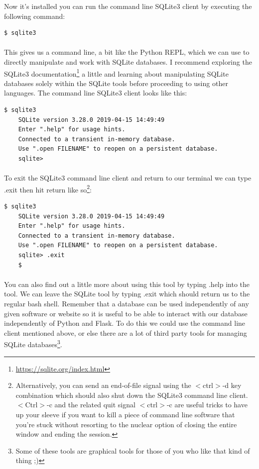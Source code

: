 \documentclass[12pt, a4paper, oneside]{book}
\begin{document}
{Now it's installed you can run the command line SQLite3 client by executing the following command:

\begin{lstlisting}[style=DOS]
    $ sqlite3
\end{lstlisting}

\paragraph{} This gives us a command line, a bit like the Python REPL, which we can use to directly manipulate and work with SQLite databases. I recommend exploring the SQLite3 documentation\footnote{\url{https://sqlite.org/index.html}} a little and learning about manipulating SQLite databases solely within the SQLite tools before proceeding to using other languages. The command line SQLite3 client looks like this:

\begin{lstlisting}[style=DOS]
    $ sqlite3 
    SQLite version 3.28.0 2019-04-15 14:49:49
    Enter ".help" for usage hints.
    Connected to a transient in-memory database.
    Use ".open FILENAME" to reopen on a persistent database.
    sqlite> 
\end{lstlisting}

\paragraph{} To exit the SQLite3 command line client and return to our terminal we can type .exit then hit return like so\footnote{Alternatively, you can send an end-of-file signal using the $<$ctrl$>$-d key combination which should also shut down the SQLite3 command line client. $<$Ctrl$>$-c and the related quit signal $<$ctrl$>$-c are useful tricks to have up your sleeve if you want to kill a piece of command line software that you're stuck without resorting to the nuclear option of closing the entire window and ending the session.}:

\begin{lstlisting}[style=DOS]
    $ sqlite3 
    SQLite version 3.28.0 2019-04-15 14:49:49
    Enter ".help" for usage hints.
    Connected to a transient in-memory database.
    Use ".open FILENAME" to reopen on a persistent database.
    sqlite> .exit
    $
\end{lstlisting}


\paragraph{} You can also find out a little more about using this tool by typing .help into the tool. We can leave the SQLite tool by typing .exit which should return us to the regular bash shell. Remember that a database can be used independently of any given software or website so it is useful to be able to interact with our database independently of Python and Flask. To do this we could use the command line client mentioned above, or else there are a lot of third party tools for managing SQLite databases\footnote{Some of these tools are graphical tools for those of you who like that kind of thing ;)}.


}
\end{document}
